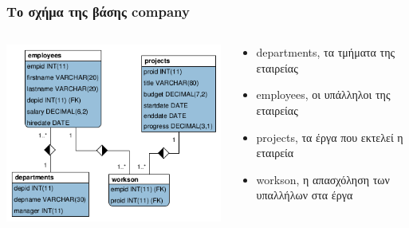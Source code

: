 \begin{frame}
\frametitle{Το σχήμα της βάσης {\en company}}
\begin{minipage}{\wE}
\begin{columns}[t]
\begin{column}{0.55\linewidth}
\begin{center}
\includegraphics[scale=0.5]{../common/companyER.png}
\end{center}
\end{column}
\begin{column}{0.4\linewidth}
\begin{center}
\begin{itemize}
  \item {\ra departments}, τα τμήματα της εταιρείας
  \item {\ra employees}, οι υπάλληλοι της εταιρείας
  \item {\ra projects}, τα έργα που εκτελεί η εταιρεία
  \item {\ra workson}, η απασχόληση των υπαλλήλων στα έργα
\end{itemize}
\end{center}
\end{column}
\end{columns}
\end{minipage}
\end{frame}


